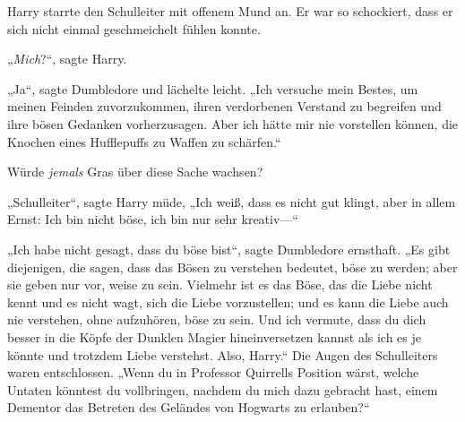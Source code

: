 Harry starrte den Schulleiter mit offenem Mund an. Er war so schockiert, dass er sich nicht einmal geschmeichelt fühlen konnte.

„\emph{Mich}?“, sagte Harry.

„Ja“, sagte Dumbledore und lächelte leicht. „Ich versuche mein Bestes, um meinen Feinden zuvorzukommen, ihren verdorbenen Verstand zu begreifen und ihre bösen Gedanken vorherzusagen. Aber ich hätte mir nie vorstellen können, die Knochen eines Hufflepuffs zu Waffen zu schärfen.“

Würde \emph{jemals} Gras über diese Sache wachsen?

„Schulleiter“, sagte Harry müde, „Ich weiß, dass es nicht gut klingt, aber in allem Ernst: Ich bin nicht böse, ich bin nur sehr kreativ—“

„Ich habe nicht gesagt, dass du böse bist“, sagte Dumbledore ernsthaft. „Es gibt diejenigen, die sagen, dass das Bösen zu verstehen bedeutet, böse zu werden; aber sie geben nur vor, weise zu sein. Vielmehr ist es das Böse, das die Liebe nicht kennt und es nicht wagt, sich die Liebe vorzustellen; und es kann die Liebe auch nie verstehen, ohne aufzuhören, böse zu sein. Und ich vermute, dass du dich besser in die Köpfe der Dunklen Magier hineinversetzen kannst als ich es je könnte und trotzdem Liebe verstehst. Also, Harry.“ Die Augen des Schulleiters waren entschlossen. „Wenn du in Professor Quirrells Position wärst, welche Untaten könntest du vollbringen, nachdem du mich dazu gebracht hast, einem Dementor das Betreten des Geländes von Hogwarts zu erlauben?“

